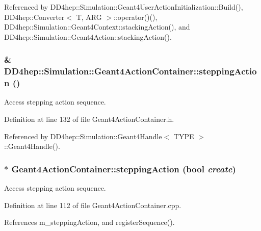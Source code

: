 Referenced by DD4hep::Simulation::Geant4UserActionInitialization::Build(), DD4hep::Converter$<$ T, ARG $>$::operator()(), DD4hep::Simulation::Geant4Context::stackingAction(), and DD4hep::Simulation::Geant4Action::stackingAction().\hypertarget{class_d_d4hep_1_1_simulation_1_1_geant4_action_container_aa9fd5d34c9a076788e24abd8906f6e3a}{
\subsubsection[{steppingAction}]{\& DD4hep::Simulation::Geant4ActionContainer::steppingAction ()}}
\label{class_d_d4hep_1_1_simulation_1_1_geant4_action_container_aa9fd5d34c9a076788e24abd8906f6e3a}


Access stepping action sequence. 

Definition at line 132 of file Geant4ActionContainer.h.

Referenced by DD4hep::Simulation::Geant4Handle$<$ TYPE $>$::Geant4Handle().\hypertarget{class_d_d4hep_1_1_simulation_1_1_geant4_action_container_a75a0fa686f783e175eedbd57ed3abbdc}{
\subsubsection[{steppingAction}]{ $\ast$ Geant4ActionContainer::steppingAction (bool {\em create})}}
\label{class_d_d4hep_1_1_simulation_1_1_geant4_action_container_a75a0fa686f783e175eedbd57ed3abbdc}


Access stepping action sequence. 

Definition at line 112 of file Geant4ActionContainer.cpp.

References m\_\-steppingAction, and registerSequence().

